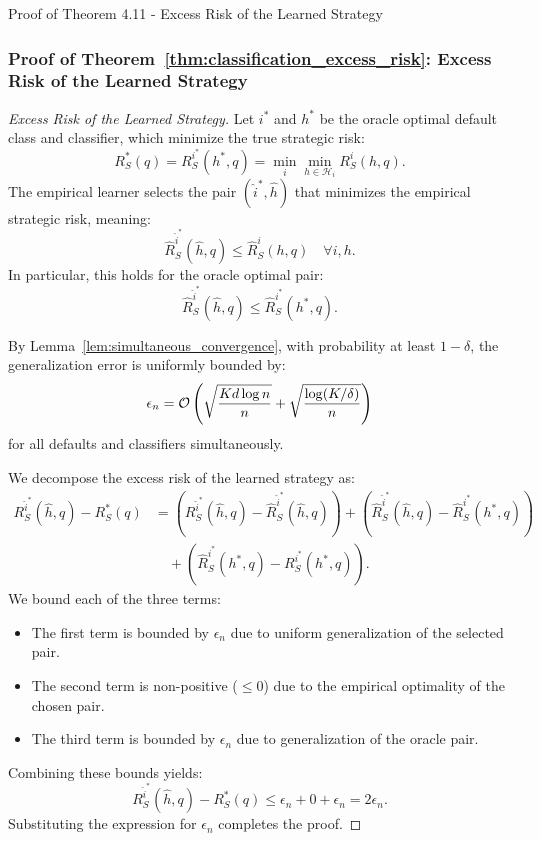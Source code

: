 \begin{sourceblock}{Proof of Theorem 4.11 - Excess Risk of the Learned Strategy}
\subsubsection*{Proof of Theorem~\ref{thm:classification_excess_risk}: Excess Risk of the Learned Strategy}
\label{app:proof_classification_excess_risk}
\begin{proof}[Excess Risk of the Learned Strategy]
Let $i^*$ and $h^*$ be the oracle optimal default class and classifier, which minimize the true strategic risk:
\begin{equation}
    R^*_S(q) = R^{i^*}_S(h^*, q) = \min_{i} \min_{h \in \mathcal{H}_i} R^i_S(h, q).
\end{equation}
The empirical learner selects the pair $(\hat{i}^*, \hat{h})$ that minimizes the empirical strategic risk, meaning:
\begin{equation}
    \hat{R}^{\hat{i}^*}_S(\hat{h}, q) \le \hat{R}^i_S(h, q) \quad \forall i, h.
\end{equation}
In particular, this holds for the oracle optimal pair:
\begin{equation}
    \hat{R}^{\hat{i}^*}_S(\hat{h}, q) \le \hat{R}^{i^*}_S(h^*, q).
\end{equation}

By Lemma~\ref{lem:simultaneous_convergence}, with probability at least $1 - \delta$, the generalization error is uniformly bounded by:
\begin{equation}
    \epsilon_n = \mathcal{O}\left( \sqrt{\frac{K d \log n}{n}} + \sqrt{\frac{\log(K/\delta)}{n}} \right)
\end{equation}
for all defaults and classifiers simultaneously.

We decompose the excess risk of the learned strategy as:
\begin{align}
    R^{\hat{i}^*}_S(\hat{h}, q) - R^*_S(q) &= \left( R^{\hat{i}^*}_S(\hat{h}, q) - \hat{R}^{\hat{i}^*}_S(\hat{h}, q) \right) + \left( \hat{R}^{\hat{i}^*}_S(\hat{h}, q) - \hat{R}^{i^*}_S(h^*, q) \right) \nonumber \\
    &\quad + \left( \hat{R}^{i^*}_S(h^*, q) - R^{i^*}_S(h^*, q) \right).
\end{align}
We bound each of the three terms:
\begin{itemize}
    \item The first term is bounded by $\epsilon_n$ due to uniform generalization of the selected pair.
    \item The second term is non-positive ($\le 0$) due to the empirical optimality of the chosen pair.
    \item The third term is bounded by $\epsilon_n$ due to generalization of the oracle pair.
\end{itemize}
Combining these bounds yields:
\begin{equation}
    R^{\hat{i}^*}_S(\hat{h}, q) - R^*_S(q) \le \epsilon_n + 0 + \epsilon_n = 2\epsilon_n.
\end{equation}
Substituting the expression for $\epsilon_n$ completes the proof.
\end{proof}
\end{sourceblock}

